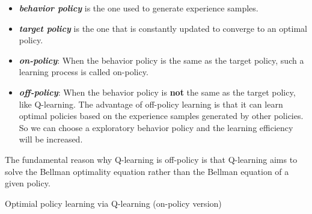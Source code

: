 \documentclass[10pt]{elegantbook}
\newcommand{\mydefination}[1]{\textbf{\textit{\textcolor{structurecolor}{#1}}}}
\begin{document}
\begin{definition}
    \begin{itemize}
        \item \mydefination{behavior policy} is the one used to generate experience samples.
        \item \mydefination{target policy} is the one that is constantly updated to converge to an optimal policy.
        \item \mydefination{on-policy}: When the behavior policy is the same as the target policy, such a learning process is called on-policy.
        \item \mydefination{off-policy}: When the behavior policy is \textbf{not} the same as the target policy, like Q-learning. The advantage of off-policy 
        learning is that it can learn optimal policies based on the experience samples generated by other policies. So we can choose a exploratory behavior 
        policy and the learning efficiency will be increased.
    \end{itemize}
\end{definition}

The fundamental reason why Q-learning is off-policy is that Q-learning aims to solve the
Bellman optimality equation rather than the Bellman equation of a given policy.

\vspace{\baselineskip}

\begin{algorithm}[H]
\caption{Optimial policy learning via Q-learning (on-policy version)}
\KwIn{Initial policy $\pi_0(a|s)$ from $q_0$, $q_0(s,a)$, $\forall (s,a), \epsilon \in (0, 1]$}

\end{algorithm}
\end{document}
